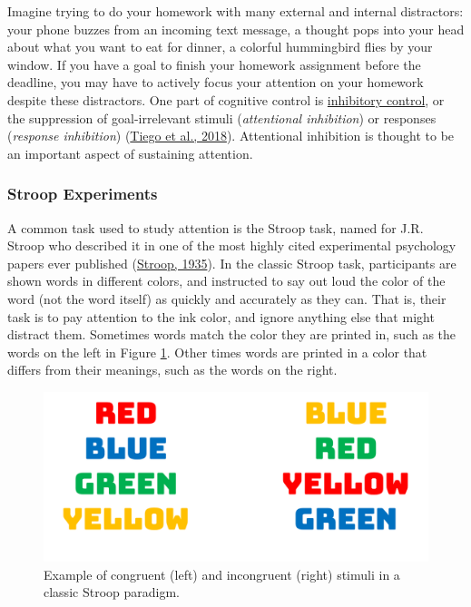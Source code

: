 \documentclass[
]{krantz}
\begin{document}
Imagine trying to do your homework with many external and internal distractors: your phone buzzes from an incoming text message, a thought pops into your head about what you want to eat for dinner, a colorful hummingbird flies by your window. If you have a goal to finish your homework assignment before the deadline, you may have to actively focus your attention on your homework despite these distractors. One part of cognitive control is \protect\hyperlink{inhibitory-control}{inhibitory control}, or the suppression of goal-irrelevant stimuli (\emph{attentional inhibition}) or responses (\emph{response inhibition}) (\protect\hyperlink{ref-Tiego2018}{Tiego et al., 2018}). Attentional inhibition is thought to be an important aspect of sustaining attention.

\hypertarget{stroop-experiments}{%
\subsubsection*{Stroop Experiments}\label{stroop-experiments}}


A common task used to study attention is the Stroop task, named for J.R. Stroop who described it in one of the most highly cited experimental psychology papers ever published (\protect\hyperlink{ref-Stroop1935}{Stroop, 1935}). In the classic Stroop task, participants are shown words in different colors, and instructed to say out loud the color of the word (not the word itself) as quickly and accurately as they can. That is, their task is to pay attention to the ink color, and ignore anything else that might distract them. Sometimes words match the color they are printed in, such as the words on the left in Figure \ref{fig:stroop}. Other times words are printed in a color that differs from their meanings, such as the words on the right.

\begin{figure}

{\centering \includegraphics[width=0.6\linewidth]{images/3_attention/stroop} 

}

\caption{Example of congruent (left) and incongruent (right) stimuli in a classic Stroop paradigm.}\label{fig:stroop}
\end{figure}
\end{document}
